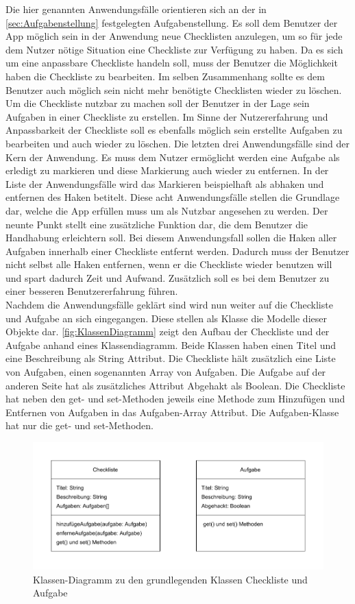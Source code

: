 Die hier genannten Anwendungsfälle orientieren sich an der in \autoref{sec:Aufgabenstellung} festgelegten Aufgabenstellung.
Es soll dem Benutzer der App möglich sein in der Anwendung neue Checklisten anzulegen, um so für jede dem Nutzer nötige Situation eine Checkliste zur Verfügung zu haben. Da es sich um eine anpassbare Checkliste handeln soll, muss der Benutzer die Möglichkeit haben die Checkliste zu bearbeiten. Im selben Zusammenhang sollte es dem Benutzer auch möglich sein nicht mehr benötigte Checklisten wieder zu löschen. Um die Checkliste nutzbar zu machen soll der Benutzer in der Lage sein Aufgaben in einer Checkliste zu erstellen. Im Sinne der Nutzererfahrung und Anpassbarkeit der Checkliste soll es ebenfalls möglich sein erstellte Aufgaben zu bearbeiten und auch wieder zu löschen. Die letzten drei Anwendungsfälle sind der Kern der Anwendung. Es muss dem Nutzer ermöglicht werden eine Aufgabe als erledigt zu markieren und diese Markierung auch wieder zu entfernen. In der Liste der Anwendungsfälle wird das Markieren beispielhaft als abhaken und entfernen des Haken betitelt. Diese acht Anwendungsfälle stellen die Grundlage dar, welche die App erfüllen muss um als Nutzbar angesehen zu werden. Der neunte Punkt stellt eine zusätzliche Funktion dar, die dem Benutzer die Handhabung erleichtern soll. Bei diesem Anwendungsfall sollen die \glqq Haken\grqq{} aller Aufgaben innerhalb einer Checkliste entfernt werden. Dadurch muss der Benutzer nicht selbst alle Haken entfernen, wenn er die Checkliste wieder benutzen will und spart dadurch Zeit und Aufwand. Zusätzlich soll es bei dem Benutzer zu einer besseren Benutzererfahrung führen.\\
Nachdem die Anwendungsfälle geklärt sind wird nun weiter auf die Checkliste und Aufgabe an sich eingegangen. Diese stellen als Klasse die Modelle dieser Objekte dar. \autoref{fig:KlassenDiagramm} zeigt den Aufbau der Checkliste und der Aufgabe anhand eines Klassendiagramm. Beide Klassen haben einen Titel und eine Beschreibung als String Attribut. Die Checkliste hält zusätzlich eine Liste von Aufgaben, einen sogenannten Array von Aufgaben. Die Aufgabe auf der anderen Seite hat als zusätzliches Attribut Abgehakt als Boolean. Die Checkliste hat neben den get- und set-Methoden jeweils eine Methode zum Hinzufügen und Entfernen von Aufgaben in das Aufgaben-Array Attribut. Die Aufgaben-Klasse hat nur die get- und set-Methoden.

\begin{figure}[h]
	\centering
	\includegraphics{Bilder/KlassenDiagramm.pdf} 
	\caption{Klassen-Diagramm zu den grundlegenden Klassen Checkliste und Aufgabe}
	\label{fig:KlassenDiagramm}
\end{figure}

